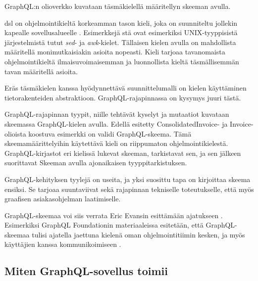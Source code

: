 GraphQL:n olioverkko kuvataan täsmäkielellä määritellyn skeeman avulla.

\Gls{dsl} on ohjelmointikieltä korkeamman tason kieli, joka on
suunniteltu jollekin kapealle sovellusalueelle \cite{landin1966next}.
Esimerkkejä stä ovat esimerkiksi UNIX-tyyppisistä
järjestelmistä tutut \emph{sed}- ja \emph{awk}-kielet. Tällaisen kielen
avulla on mahdollista määritellä monimutkaisiakin asioita nopeasti.
\cite{Raymond2003} Kieli tarjoaa tavanomaista ohjelmointikieltä
ilmaisuvoimaisemman ja luonnollista kieltä täsmällisemmän tavan
määritellä asioita.

Eräs täsmäkielen kanssa hyödynnettävä suunnittelumalli on kielen
käyttäminen tietorakenteiden abstraktioon\cite{Spi00b}.
GraphQL-rajapinnassa on kysymys juuri tästä.

GraphQL-rajapinnan tyypit, niille tehtävät kyselyt ja mutaatiot kuvataan
skeemassa GraphQL-kielen avulla. Edellä esitetty ConsolidatedInvoice- ja
Invoice-olioista koostuva esimerkki on validi GraphQL-skeema. Tämä
skeemamäärittelyihin käytettävä kieli on riippumaton
ohjelmointikielestä. GraphQL-kirjastot eri kielissä lukevat skeeman,
tarkistavat sen, ja sen jälkeen suorittavat Skeeman avulla ajonaikaisen
tyyppitarkistuksen.

GraphQL-kehityksen tyylejä on useita, ja yksi suosittu tapa on
kirjoittaa skeema ensiksi. Se tarjoaa suuntaviivat sekä rajapinnan
tekniselle toteutukselle, että myös graafisen asiakasohjelman
laatimiselle.\cites{SchemaDriven2017Nov}{SchemaDrivenDesign2021Jul}

GraphQL-skeemaa voi siis verrata Eric Evansin esittämään ajatukseen
. Esimerkiksi GraphQL
Foundationin materiaaleissa esitetään, että GraphQL-skeemaa tulisi
ajatella jaettuna kielenä oman ohjelmointitiimin kesken, ja myös
käyttäjien kanssa kommunikoimiseen .\citep{thinkingInGraphs}

\hypertarget{miten-graphql-sovellus-toimii}{%
\subsection{Miten GraphQL-sovellus
toimii}\label{miten-graphql-sovellus-toimii}}

